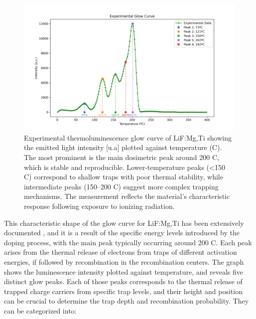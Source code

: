 \begin{figure}[ht]
    \centering
    \includegraphics[width=\textwidth]{Images/Experimental_Glow_Curve.png}
    \caption[Experimental TL glow curve of LiF:Mg,Ti.]{Experimental thermoluminescence glow curve of LiF:Mg,Ti showing the emitted light intensity [u.a] plotted against temperature (\textdegree C). The most prominent is the main dosimetric peak around 200 \textdegree C, which is stable and reproducible. Lower-temperature peaks (<150 \textdegree C) correspond to shallow traps with poor thermal stability, while intermediate peaks (150–200 \textdegree C) suggest more complex trapping mechanisms. The measurement reflects the material’s characteristic response following exposure to ionizing radiation.}
    \label{fig:ExperimentalGlowCurve}
\end{figure}
\vspace{10pt}

This characteristic shape of the glow curve for LiF:Mg,Ti has been extensively documented \cite{mckeever_course_2022} \cite{benavente_LiF} \cite{massillon-jl_role_nodate}, and it is a result of the specific energy levels introduced by the doping process, with the main peak typically occurring around 200 \textdegree C. Each peak arises from the thermal release of electrons from traps of different activation energies, if followed by recombination in the recombination centers. The graph shows the luminescence intensity plotted against temperature, and reveals five distinct glow peaks. Each of those peaks corresponds to the thermal release of trapped charge carriers from specific trap levels, and their height and position can be crucial to determine the trap depth and recombination probability. They can be categorized into:

